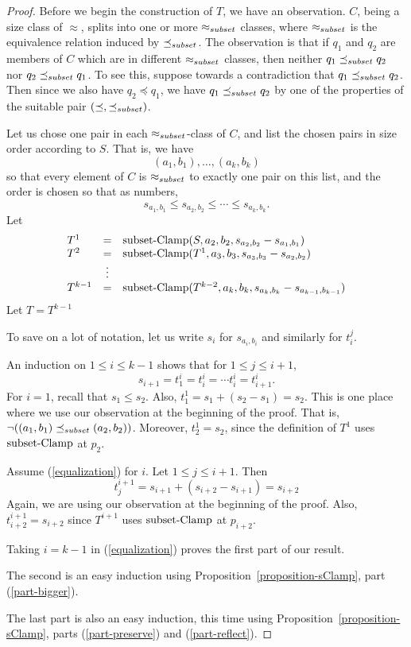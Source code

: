 \documentclass[12pt]{article}
\theoremstyle{definition}
\newcommand{\nott}{\neg}
\begin{document}
\begin{proof}
Before we begin the construction of $T$,
we have an observation.
$C$, being a size class of $\approx$, splits into one or more
$\approx_{\scriptsize subset}$ classes, where $\approx_{\scriptsize subset}$ is the equivalence relation induced by $\preceq_{\scriptsize subset}$.
The observation is that if $q_1$ and $q_2$ are members of $C$ which are in different $\approx_{\scriptsize subset}$
classes, then neither $q_1 \preceq_{\scriptsize subset} q_2$ nor  $q_2 \preceq_{\scriptsize subset} q_1$.
To see this, suppose towards a contradiction that  $q_1 \preceq_{\scriptsize subset} q_2$.
Then since we also have $q_2 \preceq q_1$, we have 
$q_1 \preceq_{\scriptsize subset} q_2$ by one of the properties of the suitable pair $(\preceq, \preceq_{\scriptsize subset})$.



Let us chose one pair in each $\approx_{\scriptsize subset}$-class of 
$C$, and list the chosen pairs in size order according to $S$.
That is, we have 
\[ (a_1, b_1), \ldots, (a_k,b_k) \]
so that every element of $C$ is $\approx_{\scriptsize subset}$ to exactly one pair on this list,
and the order is chosen so that as numbers,
\[  s_{a_1, b_1} \leq s_{a_2, b_2} \leq \cdots\leq s_{a_k, b_k}.
\]
 Let \[ \begin{array}{lcl}
 T^1  & = &  \mbox{subset-Clamp}(S,a_2,b_2,s_{a_2, b_2} - s_{a_1, b_1})\\
T^2 & = & \mbox{subset-Clamp}(T^1,a_3, b_3, s_{a_3, b_3} - s_{a_2, b_2} )\\
  & \vdots   & \\
T^{k-1} & = & \mbox{subset-Clamp}(T^{k-2},a_k,b_k,
s_{a_k, b_k} - s_{a_{k-1}, b_{k-1}})\\
\end{array}
\]
Let $T = T^{k-1}$

To save on a lot of notation, let us write $s_i$ for $s_{a_i, b_i}$
and similarly for $t^j_i$.

An induction on $1\leq i \leq k -1$ shows that
for $1 \leq j \leq i+1$,
\begin{equation}
\label{equalization}
s_{i+1}  = t^i_{1} = t^i_{i} = \cdots t^i_{i} =  t^i_{i+1}.
\end{equation}
For $i = 1$, recall that $s_1 \leq s_2$.
Also, $t^1_1 = s_1 + (s_2 - s_1) = s_2$.
This is one place where we use our observation at the beginning of the proof.
That is, $\nott ((a_1,b_1) \precsubseteq (a_2,b_2))$.
Moreover, $t^1_2= s_2$, since 
the definition of $T^1$ uses $\mbox{subset-Clamp}$ at $p_2$.



Assume (\ref{equalization}) for  $i$.
Let   $1\leq j \leq i+1$.
Then \[ t^{i+1}_j = s_{i+1} + (s_{i+2} - s_{i+1}) 
= s_{i+2}\]
Again, we are using  our observation at the beginning of the proof.
Also, $t^{i+1}_{i+2} = s_{i+2} $ since $T^{i+1}$ uses $\mbox{subset-Clamp}$
at $p_{i+2}$.

Taking $i = k -1$ in (\ref{equalization}) proves the first part of our result.

The second is an easy induction using Proposition~\ref{proposition-sClamp}, part (\ref{part-bigger}).

The last part is also an easy induction, this time using 
 Proposition~\ref{proposition-sClamp}, parts (\ref{part-preserve}) and (\ref{part-reflect}).
\end{proof}
\end{document}
